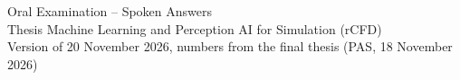 \documentclass[11pt,a4paper]{article}
\begin{document}
\begin{center}
{\LARGE\sffamily\color{qcol} Oral Examination -- Spoken Answers}\\[6pt]
{\large\sffamily Thesis \textbullet{} Machine Learning and Perception \textbullet{} AI for Simulation (rCFD)}\\[6pt]
{\small\sffamily Version of 20 November 2026, numbers from the final thesis (PAS, 18 November 2026)}
\end{center}


\tableofcontents
\clearpage

\clearpage

\clearpage

\end{document}
